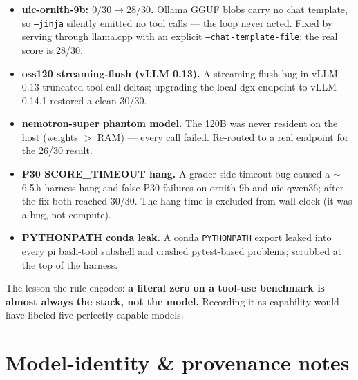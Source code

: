 \documentclass[11pt]{article}
\begin{document}
\begin{itemize}
\item \textbf{uic-ornith-9b: $0/30 \to 28/30$.} Ollama GGUF blobs carry no chat
  template, so \texttt{--jinja} silently emitted no tool calls --- the loop never
  acted. Fixed by serving through llama.cpp with an explicit
  \texttt{--chat-template-file}; the real score is 28/30.
\item \textbf{oss120 streaming-flush (vLLM 0.13).} A streaming-flush bug in vLLM
  0.13 truncated tool-call deltas; upgrading the local-dgx endpoint to vLLM 0.14.1 restored
  a clean 30/30.
\item \textbf{nemotron-super phantom model.} The 120B was never resident on the host
  (weights $>$ RAM) --- every call failed. Re-routed to a real endpoint for the 26/30
  result.
\item \textbf{P30 SCORE\_TIMEOUT hang.} A grader-side timeout bug caused a $\sim$6.5\,h
  harness hang and false P30 failures on ornith-9b and uic-qwen36; after the fix both
  reached 30/30. The hang time is excluded from wall-clock (it was a bug, not
  compute).
\item \textbf{PYTHONPATH conda leak.} A conda \texttt{PYTHONPATH} export leaked into
  every pi bash-tool subshell and crashed pytest-based problems; scrubbed at the top
  of the harness.
\end{itemize}

The lesson the rule encodes: \textbf{a literal zero on a tool-use benchmark is almost
always the stack, not the model.} Recording it as capability would have libeled five
perfectly capable models.

\section{Model-identity \& provenance notes}
\end{document}
